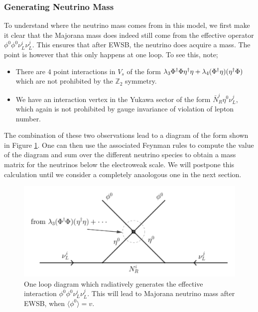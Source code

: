 \documentclass[10pt]{article}
\begin{document}
\subsubsection{Generating Neutrino Mass}
To understand where the neutrino mass comes from in this model, we first make it clear that the Majorana mass does indeed still come from the effective operator $\phi^0 \phi^0 \nu^i_L \nu^j_L$. This ensures that after EWSB, the neutrino does acquire a mass. The point is however that this only happens at one loop. To see this, note;
\begin{itemize}
  \item There are $4$ point interactions in $V_s$ of the form $\lambda_3\Phi^{\dagger} \Phi \eta^{\dagger}\eta + \lambda_4 (\Phi^{\dagger} \eta)(\eta^{\dagger} \Phi)$ which are not prohibited by the $\mathbb{Z}_2$ symmetry.
  \item We have an interaction vertex in the Yukawa sector of the form $\bar{N}^i_R \eta^0 \nu^j_L $, which again is not prohibited by gauge invariance of violation of lepton number.
\end{itemize}
The combination of these two observations lead to a diagram of the form shown in Figure \ref{fig:oneloopmassdiag}. One can then use the associated Feynman rules to compute the value of the diagram and sum over the different neutrino species to obtain a mass matrix for the neutrinos below the electroweak scale. We will postpone this calculation until we consider a completely anaologous one in the next section.
\begin{figure}
  \begin{framed}
  \centering
  \includegraphics[width=0.6\linewidth]{oneloopmass}
  \caption{One loop diagram which radiatively generates the effective interaction $\phi^0\phi^0 \nu^i_L \nu^j_L$. This will lead to Majorana neutrino mass after EWSB, when $\langle \phi^0 \rangle = v$.}
  \label{fig:oneloopmassdiag}
  \end{framed}
\end{figure}
\end{document}
